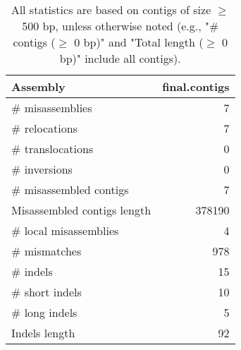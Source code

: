\documentclass[12pt,a4paper]{article}
\begin{document}
\begin{table}[ht]
\begin{center}
\caption{All statistics are based on contigs of size $\geq$ 500 bp, unless otherwise noted (e.g., "\# contigs ($\geq$ 0 bp)" and "Total length ($\geq$ 0 bp)" include all contigs).}
\begin{tabular}{|l*{1}{|r}|}
\hline
Assembly & final.contigs \\ \hline
\# misassemblies & 7 \\ \hline
\hspace{5mm}\# relocations & 7 \\ \hline
\hspace{5mm}\# translocations & 0 \\ \hline
\hspace{5mm}\# inversions & 0 \\ \hline
\# misassembled contigs & 7 \\ \hline
Misassembled contigs length & 378190 \\ \hline
\# local misassemblies & 4 \\ \hline
\# mismatches & 978 \\ \hline
\# indels & 15 \\ \hline
\hspace{5mm}\# short indels & 10 \\ \hline
\hspace{5mm}\# long indels & 5 \\ \hline
Indels length & 92 \\ \hline
\end{tabular}
\end{center}
\end{table}
\end{document}
